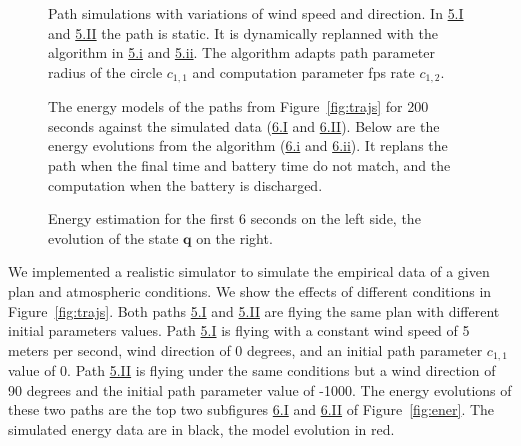 \begin{figure}[p]
  \centering
  \selectfont
  \footnotesize    
  
  \caption[Path of a static and dynamic plan]{Path simulations with variations of wind speed and direction. In \hyperref[fig:trajs-I-static]{5.I} and \hyperref[fig:trajs-II-static]{5.II} the path is static. It is dynamically replanned with the algorithm in \hyperref[fig:trajs-dyn-i]{5.i} and \hyperref[fig:trajs-dyn-ii]{5.ii}. The algorithm adapts path parameter radius of the circle $c_{1,1}$ and computation parameter fps rate $c_{1,2}$.}
  \label{fig:trajs-revised}
\end{figure}



\begin{figure}[p]
  \centering
  \selectfont
  \footnotesize    
  
  \caption[Energy models of different static and dynamic plans]{The energy models of the paths from Figure~\ref{fig:trajs} for 200 seconds against the simulated data (\hyperref[fig:ener:static-I]{6.I} and \hyperref[fig:ener:static-II]{6.II}). Below are the energy evolutions from the algorithm (\hyperref[fig:ener-dyn-i]{6.i} and \hyperref[fig:ener-dyn-ii]{6.ii}). It replans the path when the final time and battery time do not match, and the computation when the battery is discharged.}
  \label{fig:ener-revised}
\end{figure}





\begin{figure}[p]
  \centering
  \selectfont
  \footnotesize    
  
  \caption[Energy estimation and evolution of the state]{Energy estimation for the first 6 seconds on the left side, the evolution of the state $\mathbf{q}$ on the right.}
  \label{fig:evols-revised}
\end{figure}



We implemented a realistic simulator to simulate the empirical data of a given plan and atmospheric conditions. We show the effects of different conditions in Figure~\ref{fig:trajs}. Both paths \hyperref[fig:trajs-I-static]{5.I} and \hyperref[fig:trajs-II-static]{5.II} are flying the same plan with different initial parameters values. Path \hyperref[fig:trajs-I-static]{5.I} is flying with a constant wind speed of 5 meters per second, wind direction of 0 degrees, and an initial path parameter $c_{1,1}$ value of 0. Path  \hyperref[fig:trajs-II-static]{5.II} is flying under the same conditions but a wind direction of 90 degrees and the initial path parameter value of -1000. The energy evolutions of these two paths are the top two subfigures \hyperref[fig:ener:static-I]{6.I} and \hyperref[fig:ener:static-II]{6.II} of Figure~\ref{fig:ener}. The simulated energy data are in black, the model evolution in red.


